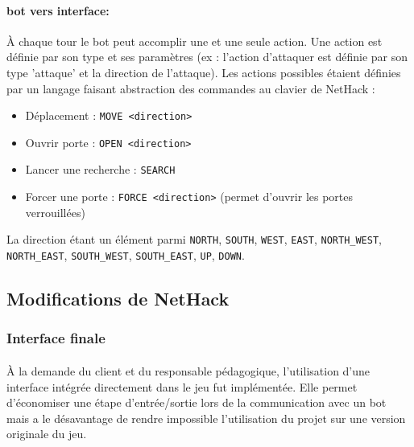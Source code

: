 \documentclass[a4paper,12pt]{article}
\begin{document}
\paragraph{bot vers interface:} À chaque tour le bot peut accomplir une et une seule action. Une action est définie par son type et ses paramètres (ex : l'action d'attaquer est définie par son type 'attaque' et la direction de l'attaque). Les actions possibles étaient définies par un langage faisant abstraction des commandes au clavier de NetHack :
\begin{itemize}
	\item Déplacement : \verb!MOVE <direction>!
	\item Ouvrir porte : \verb!OPEN <direction>!
	\item Lancer une recherche : \verb!SEARCH!
	\item Forcer une porte : \verb!FORCE <direction>! (permet d'ouvrir les portes verrouillées)
\end{itemize}
\noindent La direction étant un élément parmi \verb!NORTH!, \verb!SOUTH!, \verb!WEST!, \verb!EAST!, \verb!NORTH_WEST!, \verb!NORTH_EAST!, \verb!SOUTH_WEST!, \verb!SOUTH_EAST!, \verb!UP!, \verb!DOWN!.


\subsection{Modifications de NetHack}

\subsubsection{Interface finale}

\paragraph{}À la demande du client et du responsable pédagogique, l'utilisation d'une interface intégrée directement dans le jeu fut implémentée. Elle permet d'économiser une étape d'entrée/sortie lors de la communication avec un bot mais a le désavantage de rendre impossible l'utilisation du projet sur une version originale du jeu.
\end{document}
